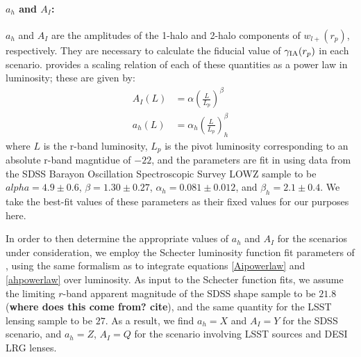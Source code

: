 \documentclass[a4paper,fleqn,usenatbib]{mnras}
\begin{document}
\paragraph*{$a_h$ and $A_I$:} $a_h$ and $A_I$ are the amplitudes of the 1-halo and 2-halo components of $w_{l+}(r_p)$, respectively. They are necessary to calculate the fiducial value of $\gamma_{\rm IA}(r_p)$ in each scenario. \cite{Singh2014} provides a scaling relation of each of these quantities as a power law in luminosity; these are given by:
\begin{align}
A_I(L) &= \alpha \left( \frac{L}{L_p}\right)^\beta \label{Aipowerlaw} \\
a_h(L) &= \alpha_h \left( \frac{L}{L_p}\right)^\beta_h \label{ahpowerlaw} 
\end{align}
where $L$ is the r-band luminosity, $L_p$ is the pivot luminosity corresponding to an absolute r-band magntidue of $-22$, and the parameters are fit in \cite{Singh2014} using data from the SDSS Barayon Oscillation Spectroscopic Survey LOWZ sample to be $alpha=4.9 \pm 0.6$, $\beta=1.30\pm0.27$, $\alpha_h=0.081 \pm 0.012$, and $\beta_h = 2.1 \pm 0.4$. We take the best-fit values of these parameters as their fixed values for our purposes here.

In order to then determine the appropriate values of $a_h$ and $A_I$ for the scenarios under consideration, we employ the Schecter luminosity function fit parameters of \cite{Loveday2012}, using the same formalism as \cite{Krause2015} to integrate equations \ref{Aipowerlaw} and \ref{ahpowerlaw} over luminosity. As input to the Schecter function fits, we assume the limiting $r$-band apparent magnitude of the SDSS shape sample to be $21.8$ ({\bf where does this come from? cite}), and the same quantity for the LSST lensing sample to be $27$. As a result, we find $a_h= X$ and $A_I= Y$ for the SDSS scenario, and $a_h=Z$, $A_I=Q$ for the scenario involving LSST sources and DESI LRG lenses.
\end{document}
